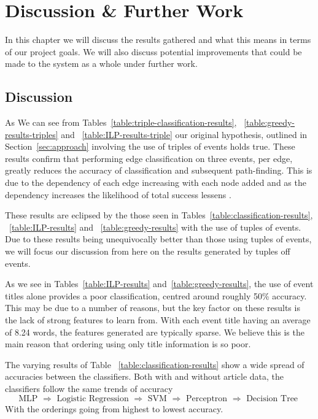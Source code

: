 \documentclass[bsc,frontabs,twoside,singlespacing,parskip,deptreport]{infthesis}     %
\begin{document}
\chapter{Discussion \& Further Work}\label{chapter:discussion}
In this chapter we will discuss the results gathered and what this means in terms of our project goals.
We will also discuss potential improvements that could be made to the system as a whole under further work.
\section{Discussion}
As We can see from Tables~\ref{table:triple-classification-results}, ~\ref{table:greedy-results-triples} and
~\ref{table:ILP-results-triple} our original hypothesis, outlined in Section~\ref{sec:approach}
involving the use of triples of events holds true.
These results confirm that performing edge classification on three events, per edge, greatly reduces the
accuracy of classification and subsequent path-finding. This is due to the dependency of each edge
increasing with each node added and as the dependency increases the likelihood of total success lessens \cite{gerdes2013computational}.

These results are eclipsed by the those seen in Tables~\ref{table:classification-results}, ~\ref{table:ILP-results} and ~\ref{table:greedy-results} with the use of tuples of events.
Due to these results being unequivocally better than those using tuples of events, we will focus our discussion from here on
the results generated by tuples off events.

As we see in  Tables~\ref{table:ILP-results} and~\ref{table:greedy-results}, the use of event titles alone
provides a poor classification, centred around roughly 50\% accuracy. This may be due to a number of reasons,
but the key factor on these results is the lack of strong features to learn from. With each event title having an average of
8.24 words, the features generated are typically  sparse. We believe this is the main reason that ordering using
only title information is so poor.

The varying results of Table ~\ref{table:classification-results} show a wide spread of accuracies between the classifiers.
Both with and without article data, the classifiers follow the same trends of accuracy
\begin{equation}
\text{MLP $\Rightarrow$ Logistic Regression $\Rightarrow$ SVM $\Rightarrow$ Perceptron $\Rightarrow$ Decision Tree }\nonumber  
\end{equation}
With the orderings going from highest to lowest accuracy.
\end{document}
